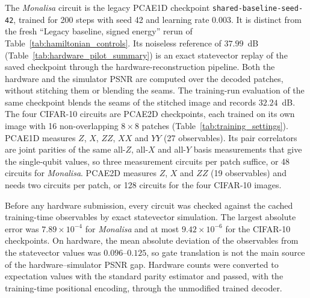 \documentclass[pdflatex,sn-basic]{sn-jnl}
\begin{document}
\begin{appendices}
The \textit{Monalisa} circuit is the legacy PCAE1D checkpoint \texttt{shared-baseline-seed-42}, trained for 200 steps with seed 42 and learning rate $0.003$.
It is distinct from the fresh ``Legacy baseline, signed energy'' rerun of Table~\ref{tab:hamiltonian_controls}.
Its noiseless reference of $37.99$~dB (Table~\ref{tab:hardware_pilot_summary}) is an exact statevector replay of the saved checkpoint through the hardware-reconstruction pipeline.
Both the hardware and the simulator PSNR are computed over the decoded patches, without stitching them or blending the seams.
The training-run evaluation of the same checkpoint blends the seams of the stitched image and records $32.24$~dB.
The four CIFAR-10 circuits are PCAE2D checkpoints, each trained on its own image with 16 non-overlapping $8\times8$ patches (Table~\ref{tab:training_settings}).
PCAE1D measures $Z$, $X$, $ZZ$, $XX$ and $YY$ (27 observables).
Its pair correlators are joint parities of the same all-$Z$, all-$X$ and all-$Y$ basis measurements that give the single-qubit values, so three measurement circuits per patch suffice, or 48 circuits for \textit{Monalisa}.
PCAE2D measures $Z$, $X$ and $ZZ$ (19 observables) and needs two circuits per patch, or 128 circuits for the four CIFAR-10 images.

Before any hardware submission, every circuit was checked against the cached training-time observables by exact statevector simulation.
The largest absolute error was $7.89\times10^{-4}$ for \textit{Monalisa} and at most $9.42\times10^{-6}$ for the CIFAR-10 checkpoints.
On hardware, the mean absolute deviation of the observables from the statevector values was $0.096$--$0.125$, so gate translation is not the main source of the hardware--simulator PSNR gap.
Hardware counts were converted to expectation values with the standard parity estimator and passed, with the training-time positional encoding, through the unmodified trained decoder.

\end{appendices}


\end{document}
